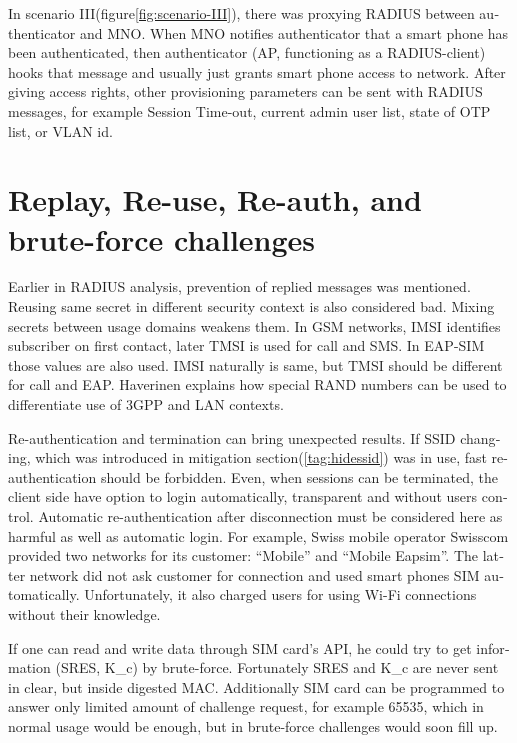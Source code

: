 \documentclass[12pt,a4paper,english]{tutthesis}
\begin{document}
\begin{otherlanguage}{english}
In scenario III(figure\ref{fig:scenario-III}),  there was proxying RADIUS between authenticator
and MNO.  When MNO notifies authenticator
that a smart phone has been authenticated, then authenticator (AP, functioning
as a RADIUS-client) hooks that message and usually just grants smart
phone access to network. After giving access rights, other
provisioning parameters can be sent with RADIUS messages, for example
Session Time-out,
current admin user list, state of OTP list, or VLAN id.


\section{Replay, Re-use, Re-auth, and brute-force challenges}
\label{sec-6-8}
Earlier in RADIUS analysis, prevention of replied messages was
mentioned. Reusing same secret in different security context is also
considered bad.  Mixing secrets between usage
domains weakens them.  In GSM networks, IMSI identifies subscriber on
first contact, later TMSI is used for call and SMS.  In EAP-SIM those
values are also used. IMSI naturally is same, but TMSI should be
different for call and EAP.  Haverinen\cite{hav-doc} explains how
special RAND numbers can be used to differentiate use of 3GPP and LAN
contexts.

Re-authentication and termination can bring unexpected results.
If SSID changing, which was introduced in mitigation section(\ref{tag:hidessid}) was in use, fast re-authentication
should be forbidden\cite[p.11]{rfc5448}.
Even, when sessions can be terminated, the client side have 
option to login automatically, transparent and without users control.
Automatic re-authentication after disconnection  must be considered
here as harmful as well as automatic login. For example,
Swiss mobile operator Swisscom provided two networks for its customer:
``Mobile'' and ``Mobile Eapsim''. The latter network did not ask customer
for connection and used smart phones SIM automatically. Unfortunately,
it also charged users for using Wi-Fi connections without their 
knowledge.\cite{swisscom}





If one can read and write data through SIM card's API,
he could try to get information (SRES, K\_c) by brute-force. 
Fortunately SRES and K\_c are never sent in clear, but inside
digested MAC. Additionally SIM card can be programmed to answer only
limited amount of challenge request, for example 65535, which in
normal usage would be enough, but in brute-force challenges 
would soon fill up.



\end{otherlanguage}
\end{document}
